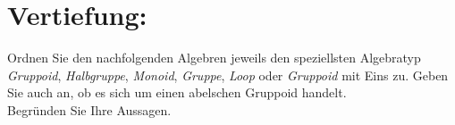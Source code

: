 



    \maketitle
    \section*{Vertiefung:}
    Ordnen Sie den nachfolgenden Algebren jeweils den speziellsten Algebratyp \textsl{Gruppoid}, \textsl{Halbgruppe},
    \textsl{Monoid}, \textsl{Gruppe}, \textsl{Loop} oder \textsl{Gruppoid} mit Eins zu. Geben Sie auch an, ob es sich um
    einen abelschen Gruppoid handelt. \\
    Begründen Sie Ihre Aussagen.
